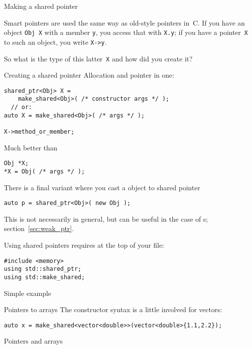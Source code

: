  {Making a shared pointer}
\label{sec:shared_ptr}

Smart pointers are used the same way as old-style pointers in~C.
If you have an
object \lstinline{Obj X} with a member \lstinline{y}, you access that with \lstinline{X.y}; if you
have a pointer~\lstinline{X} to such an object, you write \lstinline{X->y}.

So what is the type of this latter~\lstinline{X} and how did you create it?

\begin{block}{Creating a shared pointer}
  \label{sl:make-shared}
  Allocation and pointer in one:
\begin{lstlisting}
shared_ptr<Obj> X =
    make_shared<Obj>( /* constructor args */ );
  // or:
auto X = make_shared<Obj>( /* args */ );

X->method_or_member;
\end{lstlisting}
Much better than
\begin{lstlisting}
Obj *X;
*X = Obj( /* args */ );
\end{lstlisting}
\end{block}

There is a final variant where you cast a  object to shared
pointer
\begin{lstlisting}
auto p = shared_ptr<Obj>( new Obj );
\end{lstlisting}
This is not necessarily in general, but can be useful in the case of
s; section~\ref{sec:weak_ptr}.

Using shared pointers requires at the top of your file:
\begin{lstlisting}
#include <memory>
using std::shared_ptr;
using std::make_shared;
\end{lstlisting}

\begin{block}{Simple example}
  \label{sl:shared-ptr}
\end{block}

\begin{block}{Pointers to arrays}
  \label{sl:shared-vector}
  The constructor syntax is a little involved for vectors:
\begin{lstlisting}
auto x = make_shared<vector<double>>(vector<double>{1.1,2.2});
\end{lstlisting}
\end{block}

 {Pointers and arrays}

